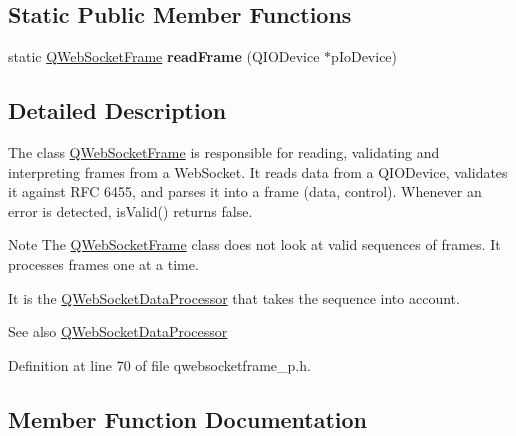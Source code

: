 \subsection*{Static Public Member Functions}
\begin{DoxyCompactItemize}
\item 
\mbox{\label{class_q_web_socket_frame_a7c85311219636ec4840a85e0a002100a}} 
static \mbox{\hyperlink{class_q_web_socket_frame}{Q\+Web\+Socket\+Frame}} {\bfseries read\+Frame} (Q\+I\+O\+Device $\ast$p\+Io\+Device)
\end{DoxyCompactItemize}


\subsection{Detailed Description}
The class \mbox{\hyperlink{class_q_web_socket_frame}{Q\+Web\+Socket\+Frame}} is responsible for reading, validating and interpreting frames from a Web\+Socket. It reads data from a Q\+I\+O\+Device, validates it against R\+FC 6455, and parses it into a frame (data, control). Whenever an error is detected, is\+Valid() returns false.

\begin{DoxyNote}{Note}
The \mbox{\hyperlink{class_q_web_socket_frame}{Q\+Web\+Socket\+Frame}} class does not look at valid sequences of frames. It processes frames one at a time. 

It is the \mbox{\hyperlink{class_q_web_socket_data_processor}{Q\+Web\+Socket\+Data\+Processor}} that takes the sequence into account.
\end{DoxyNote}
\begin{DoxySeeAlso}{See also}
\mbox{\hyperlink{class_q_web_socket_data_processor}{Q\+Web\+Socket\+Data\+Processor}} 
\end{DoxySeeAlso}


Definition at line 70 of file qwebsocketframe\+\_\+p.\+h.



\subsection{Member Function Documentation}
\mbox{\label{class_q_web_socket_frame_a27035db6c866b11f552650282bf9cc89}} 
